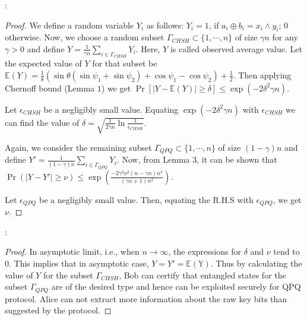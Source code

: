 \documentclass[twocolumn,pra,aps,amssymb]{revtex4}
\begin{document}
: 
\begin{proof}
We define a random variable $Y_i$ as follows:
  $Y_i= 1$, if $a_i\oplus b_i=x_i \wedge {y_i}$; 0 otherwise.
 Now, we choose a random subset $\Gamma_{CHSH}\subset \{1,\cdots,n\}$ of size $\gamma n$ for any $\gamma>0$ and define $Y=\frac{1}{\gamma n}\sum_{i\in \Gamma_{CHSH}} Y_i$. Here, $Y$ is called observed average value. Let the expected value of $Y$ for that subset be $\mathbb{E}(Y)=\frac{1}{8}(\sin{\theta}(\sin\psi_1+\sin\psi_2)+\cos\psi_1-\cos\psi_2)+\frac{1}{2}$.  Then applying Chernoff bound (Lemma $1$) we get $\Pr\left[|Y-\mathbb{E}(Y)| \geq \delta \right] \leq \exp(-2 \delta^2 \gamma n).$ 

Let $\epsilon_{CHSH}$ be a negligibly small value. Equating $\exp(-2\delta^2 \gamma n)$ with $\epsilon_{CHSH}$ we can find the value of $\delta=\sqrt{\frac{1}{2\gamma n} \ln{\frac{1}{\epsilon_{CHSH}}}}$.
 
 Again, we consider the remaining subset $\Gamma_{QPQ}\subset \{1,\cdots,n\}$ of size $(1-\gamma) n$ and define $Y'=\frac{1}{(1-\gamma)n}\sum_{i\in \Gamma_{QPQ}} Y_i$. Now, from Lemma 3, it can be shown that $\Pr(|Y-Y'|\geq \nu) \leq \exp\left(\frac{-2\gamma^2\nu^2(n-\gamma n)n^3}{(\gamma n+1)n^2}\right).$ 

Let $\epsilon_{QPQ}$ be a negligibly small value. Then, equating the R.H.S with $\epsilon_{QPQ}$, we get $\nu$. \end{proof}

: 
\begin{proof}
 In asymptotic limit, i.e., when $n\rightarrow \infty$, the expressions for $\delta$ and $\nu$ tend to $0$. This implies that in asymptotic case, $Y=Y'=\mathbb{E(Y)}$. Thus by calculating the value of $Y$ for the subset $\Gamma_{CHSH}$,  Bob can certify that  entangled states for the subset $\Gamma_{QPQ}$ are of the desired type and hence can be exploited securely for QPQ protocol. Alice can not extract more information about the raw key bits than suggested by the protocol.
 \end{proof}
\end{document}
